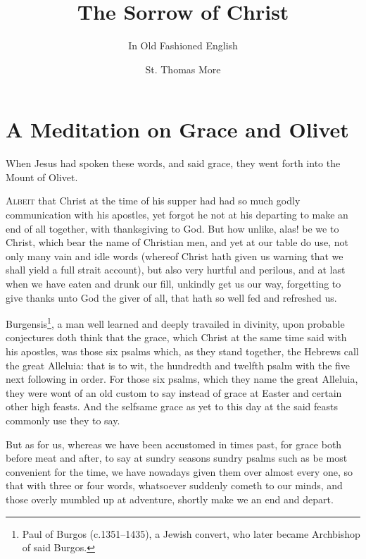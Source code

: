 \documentclass[a5paper]{scrbook}
\begin{document}
	\setmainfont{Linux Libertine O}
	\title{The Sorrow of Christ}
	\subtitle{In Old Fashioned English}
	\author{St. Thomas More}
	\frontmatter
	\maketitle
	\tableofcontents
	\mainmatter
	\chapter{A Meditation on Grace and Olivet}
	
	\begin{scripture}[Matthew 26:30]
		When Jesus had spoken these words, and said grace, they went forth into the
		Mount of Olivet.
	\end{scripture}
	
	\vspace{10mm}
	
	\lettrine{A}{lbeit} that Christ at the time of his supper had had so much godly communication with his apostles, yet forgot he not at his departing to make an end of all together, with thanksgiving to God. But how unlike, alas! be we to Christ, which bear the name of Christian men, and yet at our table do use, not only many vain and idle words (whereof Christ hath given us warning that we shall yield a full strait account), but also very hurtful and perilous, and at last when we have eaten and drunk our fill, unkindly get us our way, forgetting to give thanks unto God the giver of all, that hath so well fed and refreshed us.
	
	Burgensis\footnote{Paul of Burgos (c.1351–1435), a Jewish convert, who later became Archbishop of said Burgos.}, a man well learned and deeply travailed in divinity, upon probable conjectures doth think that the grace, which Christ at the same time said with his apostles, was those six psalms which, as they stand together, the Hebrews call the great Alleluia: that is to wit, the hundredth and twelfth psalm with the five next following in order. For those six psalms, which they name the great Alleluia, they were wont of an old custom to say instead of grace at Easter and certain other high feasts. And the selfsame grace as yet to this day at the said feasts commonly use they to say.
	
	But as for us, whereas we have been accustomed in times past, for grace both before meat and after, to say at sundry seasons sundry psalms such as be most convenient for the time, we have nowadays given them over almost every one, so that with three or four words, whatsoever suddenly cometh to our minds, and those overly mumbled up at adventure, shortly make we an end and depart.
	
\end{document}
